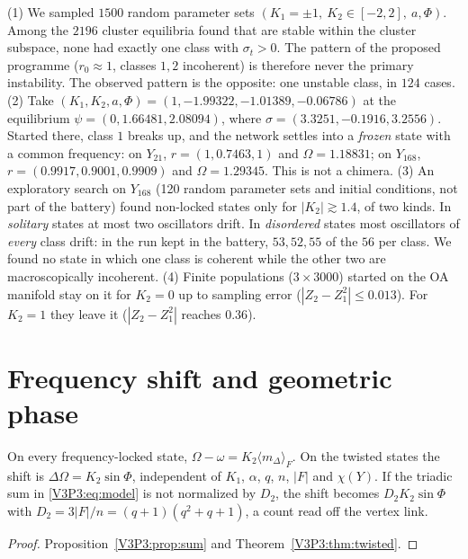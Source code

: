 \begin{remark}\label{V3P3:rem:numerics}
(1) We sampled $1500$ random parameter sets $(K_1=\pm1,\ K_2\in[-2,2],\ a,\Phi)$. Among the
$2196$ cluster equilibria found that are stable within the cluster subspace, none had
exactly one class with $\sigma_t>0$. The pattern of the proposed programme ($r_0\approx1$, classes
$1,2$ incoherent) is therefore never the primary instability. The observed pattern is the
opposite: one unstable class, in $124$ cases.
(2) Take $(K_1,K_2,a,\Phi)=(1,-1.99322,-1.01389,-0.06786)$ at the equilibrium
$\psi=(0,1.66481,2.08094)$, where $\sigma=(3.3251,-0.1916,3.2556)$. Started there, class $1$
breaks up, and the network settles into a \emph{frozen} state with a common frequency: on
$Y_{21}$, $r=(1,0.7463,1)$ and $\Omega=1.18831$; on $Y_{168}$, $r=(0.9917,0.9001,0.9909)$ and
$\Omega=1.29345$. This is not a chimera.
(3) An exploratory search on $Y_{168}$ (120 random parameter sets and initial conditions, not
part of the battery) found non-locked states only for $|K_2|\gtrsim1.4$, of two kinds. In
\emph{solitary} states at most two oscillators drift. In \emph{disordered} states most
oscillators of \emph{every} class drift: in the run kept in the battery, $53,52,55$ of the $56$
per class. We found no state in which one class is coherent while the other two are
macroscopically incoherent.
(4) Finite populations ($3\times3000$) started on the OA manifold stay on it for $K_2=0$ up to
sampling error ($|Z_2-Z_1^{2}|\le0.013$). For $K_2=1$ they leave it ($|Z_2-Z_1^{2}|$ reaches
$0.36$).
\end{remark}

\section{Frequency shift and geometric phase}\label{V3P3:sec:berry}

\begin{theorem}\label{V3P3:thm:shift}
On every frequency-locked state, $\Omega-\omega=K_2\langle m_\Delta\rangle_F$. On the
twisted states the shift is $\Delta\Omega=K_2\sin\Phi$, independent of $K_1$, $\alpha$, $q$,
$n$, $|F|$ and $\chi(Y)$. If the triadic sum in \eqref{V3P3:eq:model} is not normalized by
$D_2$, the shift becomes $D_2K_2\sin\Phi$ with $D_2=3|F|/n=(q+1)(q^{2}+q+1)$, a count read off
the vertex link.
\end{theorem}

\begin{proof}
Proposition~\ref{V3P3:prop:sum} and Theorem~\ref{V3P3:thm:twisted}.
\end{proof}

